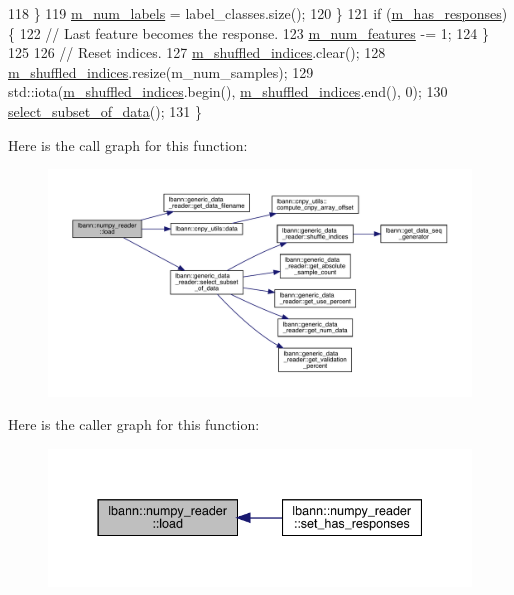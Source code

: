 \begin{DoxyCode}
118     \}
119     \hyperlink{classlbann_1_1numpy__reader_ab311c3567e1ecc1770a4bc299ab0a3e2}{m\_num\_labels} = label\_classes.size();
120   \}
121   \textcolor{keywordflow}{if} (\hyperlink{classlbann_1_1numpy__reader_a7567338be86dff81afece19d031a942d}{m\_has\_responses}) \{
122     \textcolor{comment}{// Last feature becomes the response.}
123     \hyperlink{classlbann_1_1numpy__reader_aef25f95077f565fa9616ec353b93f675}{m\_num\_features} -= 1;
124   \}
125 
126   \textcolor{comment}{// Reset indices.}
127   \hyperlink{classlbann_1_1generic__data__reader_aaab6aeff67ffff1c689336851fec2c57}{m\_shuffled\_indices}.clear();
128   \hyperlink{classlbann_1_1generic__data__reader_aaab6aeff67ffff1c689336851fec2c57}{m\_shuffled\_indices}.resize(m\_num\_samples);
129   std::iota(\hyperlink{classlbann_1_1generic__data__reader_aaab6aeff67ffff1c689336851fec2c57}{m\_shuffled\_indices}.begin(), \hyperlink{classlbann_1_1generic__data__reader_aaab6aeff67ffff1c689336851fec2c57}{m\_shuffled\_indices}.end(), 0);
130   \hyperlink{classlbann_1_1generic__data__reader_aa28fdeeb6af492540f507e49adff5d6c}{select\_subset\_of\_data}();
131 \}
\end{DoxyCode}
Here is the call graph for this function\+:\nopagebreak
\begin{figure}[H]
\begin{center}
\leavevmode
\includegraphics[width=350pt]{classlbann_1_1numpy__reader_aafc34d19b30845d54175911d143349de_cgraph}
\end{center}
\end{figure}
Here is the caller graph for this function\+:\nopagebreak
\begin{figure}[H]
\begin{center}
\leavevmode
\includegraphics[width=337pt]{classlbann_1_1numpy__reader_aafc34d19b30845d54175911d143349de_icgraph}
\end{center}
\end{figure}
\mbox{\label{classlbann_1_1numpy__reader_acaa3bec8f120bd5a905219378f663cda}} 
